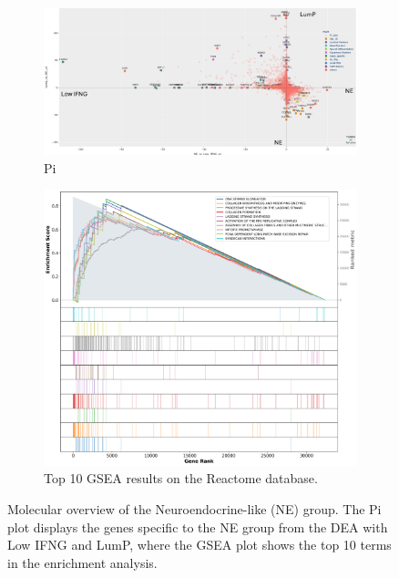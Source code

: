 \begin{figure}[!htb]
    \centering
    \begin{subfigure}[!t]{0.79\textwidth}
        \includegraphics[width=\textwidth,keepaspectratio]{Sections/ClusteringAnalysis/Resources/discussion/other_groups/ne_pi.png}    
        \caption{Pi}
        \label{fig:cs:ne_pi}
    \end{subfigure}
    \centering
    \begin{subfigure}[!t]{0.59\textwidth}
        \includegraphics[width=\textwidth, keepaspectratio]{Sections/ClusteringAnalysis/Resources/discussion/other_groups/ne2_reactome_10_top.png}
        \caption{Top 10 GSEA results on the Reactome database.}
        \label{fig:cs:ne_gsea}
    \end{subfigure} 
    \centering
    \caption{Molecular overview of the Neuroendocrine-like (NE) group. The Pi plot displays the genes specific to the NE group from the DEA with Low IFNG and LumP, where the GSEA plot shows the top 10 terms in the enrichment analysis.} 
    \label{fig:cs:ne}
\end{figure}

